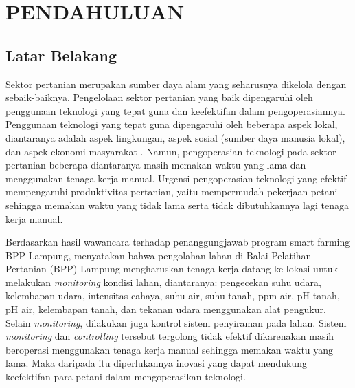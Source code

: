 
\chapter{PENDAHULUAN}

\vspace{4.5pt}

\begin{flushleft}
  \begin{justify}
    \section{Latar Belakang} 
    Sektor pertanian merupakan sumber daya alam yang seharusnya dikelola dengan sebaik-baiknya. 
    Pengelolaan sektor pertanian yang baik dipengaruhi oleh penggunaan teknologi yang tepat guna dan keefektifan dalam pengoperasiannya. 
    Penggunaan teknologi yang tepat guna dipengaruhi oleh beberapa aspek lokal, diantaranya adalah aspek lingkungan, aspek sosial (sumber daya manusia lokal), dan aspek ekonomi masyarakat \cite{dokumenBalitbang,teknologi}. Namun, pengoperasian teknologi pada sektor pertanian beberapa diantaranya masih 
    memakan waktu yang lama dan menggunakan tenaga kerja manual. Urgensi pengoperasian teknologi yang efektif mempengaruhi produktivitas 
    pertanian, yaitu mempermudah pekerjaan petani sehingga memakan waktu yang tidak lama serta tidak dibutuhkannya lagi tenaga kerja manual. 

    Berdasarkan hasil wawancara terhadap penanggungjawab program smart farming BPP Lampung, menyatakan bahwa pengolahan lahan di 
    Balai Pelatihan Pertanian (BPP) Lampung mengharuskan tenaga kerja datang ke lokasi untuk melakukan \textit{monitoring} 
    kondisi lahan, diantaranya: pengecekan suhu udara, kelembapan udara, intensitas cahaya, suhu air, suhu tanah, ppm air, 
    pH tanah, pH air, kelembapan tanah, dan tekanan udara menggunakan alat pengukur. Selain \textit{monitoring}, dilakukan juga 
    kontrol sistem penyiraman pada lahan. Sistem \textit{monitoring} dan \textit{controlling} tersebut tergolong tidak efektif 
    dikarenakan masih beroperasi menggunakan tenaga kerja manual sehingga memakan waktu yang lama. Maka daripada itu diperlukannya  
    inovasi yang dapat mendukung keefektifan para petani dalam mengoperasikan teknologi. 


\end{justify}
\end{flushleft}
